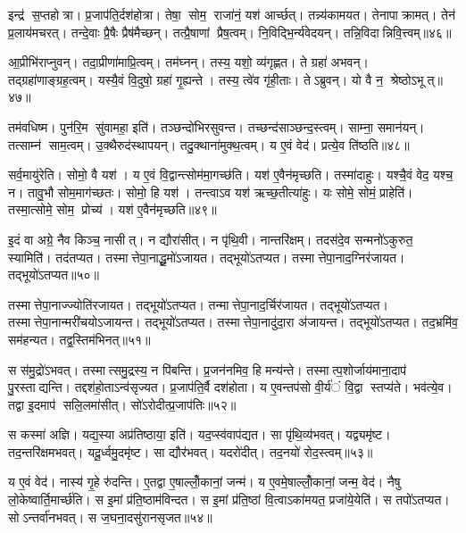 इन्द्र॑ स॒प्तहोत्रा। प्र॒जाप॑ति॒र्दश॑होत्रा। तेषा॒ सोम॒ राजा॑नं॒ यश॑ आर्च्छत्। तन्न्य॑कामयत। तेनापाक्रामत्। तेन॑ प्र॒लाय॑मचरत्। तन्दे॒वाः प्रै॒षैः प्रैष॑मैच्छन्। तत्प्रै॒षाणां प्रैष॒त्वम्। नि॒विद्भि॒र्न्य॑वेदयन्। तन्नि॒विदान्निवि॒त्त्वम्॥४६॥

आ॒प्रीभि॑राप्नुवन्। तदा॒प्रीणा॑माप्रि॒त्वम्। तम॑घ्नन्। तस्य॒ यशो॒ व्य॑गृह्णत। ते ग्रहा॑ अभवन्। तद्ग्रहा॑णाङ्ग्रह॒त्वम्। यस्यै॒वं वि॒दुषो॒ ग्रहा॑ गृ॒ह्यन्ते। तस्य॒ त्वे॑व गृ॑ही॒ताः। तेऽब्रुवन्। यो वै न॒ श्रेष्ठोऽभूत्॥४७॥

तम॑वधिष्म। पुन॑रि॒म सु॑वामहा॒ इति॑। तञ्छन्दो॑भिरसुवन्त। तच्छन्द॑साञ्छन्द॒स्त्वम्। साम्ना॒ समान॑यन्। तत्साम्न॑ साम॒त्वम्। उ॒क्थैरुद॑स्थापयन्। तदु॒क्थाना॑मुक्थ॒त्वम्। य ए॒वं वेद॑। प्रत्ये॒व ति॑ष्ठति॥४८॥

सर्व॒मायु॑रेति। सोमो॒ वै यश॑। य ए॒वं वि॒द्वान्त्सोम॑मा॒गच्छ॑ति। यश॑ ए॒वैन॑मृच्छति। तस्मा॑दाहुः। यश्चै॒वं वेद॒ यश्च॒ न। तावु॒भौ सोम॒माग॑च्छतः। सोमो॒ हि यश॑। तन्त्वाऽव यश॑ ऋच्छ॒तीत्या॑हुः। यः सोमे॒ सोमं॒ प्राहेति॑। तस्मा॒त्सोमे॒ सोम॒ प्रोच्य॑। यश॑ ए॒वैन॑मृच्छति॥४९॥

इ॒दं वा अग्रे॒ नैव किञ्च॒ नासीत्। न द्यौरा॑सीत्। न पृ॑थि॒वी। नान्तरि॑क्षम्। तदस॑दे॒व सन्मनो॑ऽकुरुत॒ स्यामिति॑। तद॑तप्यत। तस्मात्तेपा॒नाद्धू॒मो॑ऽजायत। तद्भूयो॑ऽतप्यत। तस्मात्तेपा॒नाद॒ग्निर॑जायत। तद्भूयो॑ऽतप्यत॥५०॥

तस्मात्तेपा॒नाज्ज्योति॑रजायत। तद्भूयो॑ऽतप्यत। तन्मात्तेपा॒नाद॒र्चिर॑जायत। तद्भूयो॑ऽतप्यत। तस्मात्तेपा॒नान्मरी॑चयोऽजायन्त। तद्भूयो॑ऽतप्यत। तस्मात्तेपा॒नादु॑दा॒रा अ॑जायन्त। तद्भूयो॑ऽतप्यत। तद॒भ्रमि॑व॒ सम॑हन्यत। तद्व॒स्तिम॑भिनत्॥५१॥

स स॑मु॒द्रो॑ऽभवत्। तस्मात्समु॒द्रस्य॒ न पि॑बन्ति। प्र॒जन॑नमिव॒ हि मन्य॑न्ते। तस्मात्प॒शोर्जाय॑माना॒दाप॑ पु॒रस्ताद्यन्ति। तद्दश॑हो॒ताऽन्व॑सृज्यत। प्र॒जाप॑ति॒र्वै दश॑होता। य ए॒वन्तप॑सो वी॒र्य॑ं वि॒द्वा स्तप्य॑ते। भव॑त्ये॒व। तद्वा इ॒दमाप॑ सलि॒लमा॑सीत्। सो॑ऽरोदीत्प्र॒जाप॑तिः॥५२॥

स कस्मा॑ अज्ञि। यद्य॒स्या अप्र॑तिष्ठाया॒ इति॑। यद॒प्स्व॑वाप॑द्यत। सा पृ॑थि॒व्य॑भवत्। यद्व्यमृ॑ष्ट। तद॒न्तरि॑क्षमभवत्। यदू॒र्ध्वमु॒दमृ॑ष्ट। सा द्यौर॑भवत्। यदरो॑दीत्। तद॒नयो॑ रोद॒स्त्वम्॥५३॥

य ए॒वं वेद॑। नास्य॑ गृ॒हे रु॑दन्ति। ए॒तद्वा ए॒षाल्लोँ॒कानां॒ जन्म॑। य ए॒वमे॒षाल्लोँ॒कानां॒ जन्म॒ वेद॑। नैषु लो॒केष्वार्ति॒मार्च्छ॑ति। स इ॒मां प्र॑ति॒ष्ठाम॑विन्दत। स इ॒मां प्र॑ति॒ष्ठां वि॒त्वाऽका॑मयत॒ प्रजा॑ये॒येति॑। स तपो॑ऽतप्यत। सोऽन्तर्वा॑नभवत्। स ज॒घना॒दसु॑रानसृजत॥५४॥

